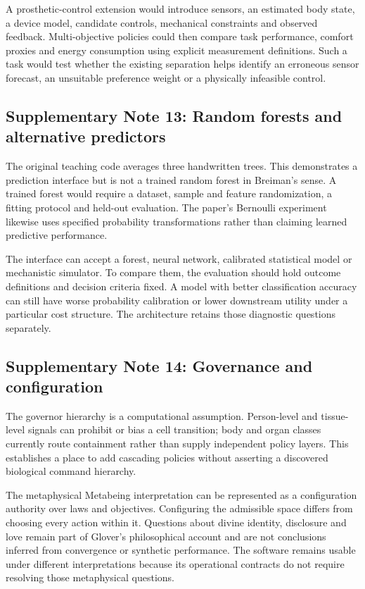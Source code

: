 \documentclass[10pt,a4paper]{article}
\begin{document}
A prosthetic-control extension would introduce sensors, an estimated body state, a device model, candidate controls, mechanical constraints and observed feedback. Multi-objective policies could then compare task performance, comfort proxies and energy consumption using explicit measurement definitions. Such a task would test whether the existing separation helps identify an erroneous sensor forecast, an unsuitable preference weight or a physically infeasible control.

\subsection*{Supplementary Note 13: Random forests and alternative predictors}
The original teaching code averages three handwritten trees. This demonstrates a prediction interface but is not a trained random forest in Breiman's sense\cite{breiman}. A trained forest would require a dataset, sample and feature randomization, a fitting protocol and held-out evaluation. The paper's Bernoulli experiment likewise uses specified probability transformations rather than claiming learned predictive performance.

The interface can accept a forest, neural network, calibrated statistical model or mechanistic simulator. To compare them, the evaluation should hold outcome definitions and decision criteria fixed. A model with better classification accuracy can still have worse probability calibration or lower downstream utility under a particular cost structure. The architecture retains those diagnostic questions separately.

\subsection*{Supplementary Note 14: Governance and configuration}
The governor hierarchy is a computational assumption. Person-level and tissue-level signals can prohibit or bias a cell transition; body and organ classes currently route containment rather than supply independent policy layers. This establishes a place to add cascading policies without asserting a discovered biological command hierarchy.

The metaphysical Metabeing interpretation can be represented as a configuration authority over laws and objectives. Configuring the admissible space differs from choosing every action within it. Questions about divine identity, disclosure and love remain part of Glover's philosophical account and are not conclusions inferred from convergence or synthetic performance. The software remains usable under different interpretations because its operational contracts do not require resolving those metaphysical questions.
\end{document}
